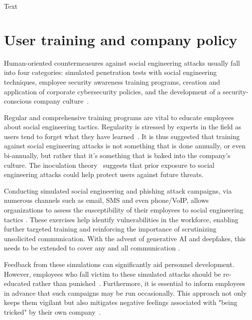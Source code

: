 Text


\section{User training and company policy}
\begin{comment}
    
    - VoIP has been defined before 

\end{comment}


Human-oriented countermeasures against social engineering attacks usually fall into four categories: simulated penetration tests with social engineering techniques, employee security awareness training programs, creation and application of corporate cybersecurity policies, and the development of a security-conscious company culture~\citep{tsinganos_Towards_Automated_Recognition_Chat_SE_Enterprise_2018, mitnick_The_Art_of_Deception_2003}.

Regular and comprehensive training programs are vital to educate employees about social engineering tactics. Regularity is stressed by experts in the field as users tend to forget what they have learned~\citep{hadnagy_Social_Engineering_The_Science_2018, mitnick_The_Art_of_Deception_2003}. It is thus suggested that training against social engineering attacks is not something that is done annually, or even bi-annually, but rather that it's something that is baked into the company's culture. The inoculation theory~\citep{blauth_AI_Crime_Overview_Malicious_Use_Abuse_2022} suggests that prior exposure to social engineering attacks could help protect users against future threats.

Conducting simulated social engineering and phishing attack campaigns, via numerous channels such as email, SMS and even phone/VoIP, allows organizations to assess the susceptibility of their employees to social engineering tactics \citep{hadnagy_Social_Engineering_The_Science_2018}. These exercises help identify vulnerabilities in the workforce, enabling further targeted training and reinforcing the importance of scrutinizing unsolicited communication. With the advent of generative AI and deepfakes, this needs to be extended to cover any and all communication \citep{mirsky_Creation_Detection_Deepfakes_2021}.

Feedback from these simulations can significantly aid personnel development. However, employees who fall victim to these simulated attacks should be re-educated rather than punished~\citep{mitnick_The_Art_of_Deception_2003}. Furthermore, it is essential to inform employees in advance that such campaigns may be run occasionally. This approach not only keeps them vigilant but also mitigates negative feelings associated with "being tricked" by their own company~\citep{hadnagy_Social_Engineering_The_Science_2018}.

